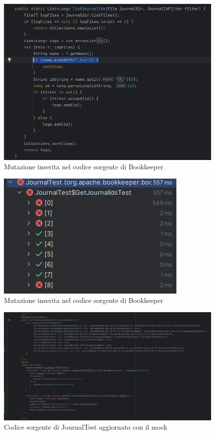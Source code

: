 \documentclass[12pt, a4paper]{article}
\begin{document}
  \begin{figure}
    \includegraphics[width=\linewidth]{./images/journal/PitMutation1.png}
    \caption{Mutazione inserita nel codice sorgente di Bookkeeper}
    \label{fig:PitMutation1}
  \end{figure}

  \begin{figure}
    \includegraphics[width=\linewidth]{./images/journal/PitTestFails.png}
    \caption{Mutazione inserita nel codice sorgente di Bookkeeper}
    \label{fig:PitMutation2}
  \end{figure}

  \begin{figure}
    \includegraphics[width=\linewidth]{./images/journal/code2.png}
    \caption{Codice sorgente di JournalTest aggiornato con il mock}
    \label{fig:code2}
  \end{figure}
\end{document}
